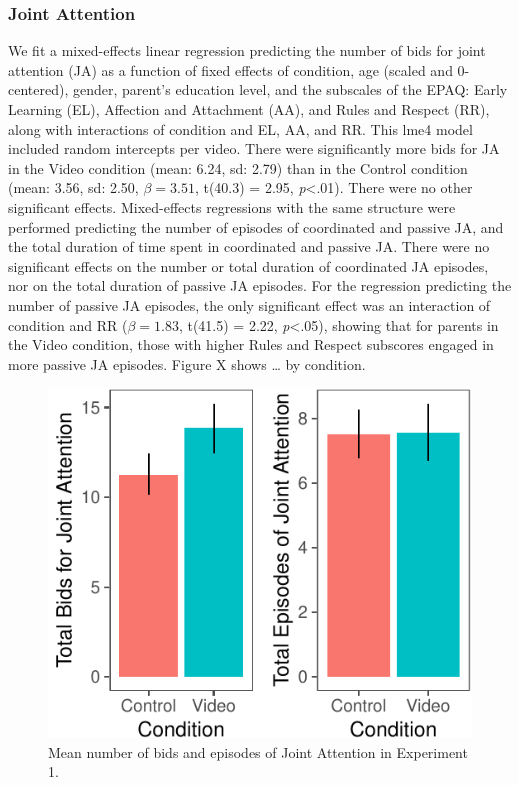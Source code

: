 \documentclass[]{article}
\begin{document}
\hypertarget{joint-attention}{%
\subsubsection{Joint Attention}\label{joint-attention}}

We fit a mixed-effects linear regression predicting the number of bids
for joint attention (JA) as a function of fixed effects of condition,
age (scaled and 0-centered), gender, parent's education level, and the
subscales of the EPAQ: Early Learning (EL), Affection and Attachment
(AA), and Rules and Respect (RR), along with interactions of condition
and EL, AA, and RR. This lme4 model included random intercepts per
video. There were significantly more bids for JA in the Video condition
(mean: 6.24, sd: 2.79) than in the Control condition (mean: 3.56, sd:
2.50, \(\beta=3.51\), t(40.3) = 2.95, \emph{p}\textless{}.01). There
were no other significant effects. Mixed-effects regressions with the
same structure were performed predicting the number of episodes of
coordinated and passive JA, and the total duration of time spent in
coordinated and passive JA. There were no significant effects on the
number or total duration of coordinated JA episodes, nor on the total
duration of passive JA episodes. For the regression predicting the
number of passive JA episodes, the only significant effect was an
interaction of condition and RR (\(\beta=1.83\), t(41.5) = 2.22,
\emph{p}\textless{}.05), showing that for parents in the Video
condition, those with higher Rules and Respect subscores engaged in more
passive JA episodes. Figure X shows \ldots{} by condition.

\begin{figure}[H]

{\centering \includegraphics{figs/e1ja-graphs-1} 

}

\caption{Mean number of bids and episodes of Joint Attention in Experiment 1.}\label{fig:e1ja-graphs}
\end{figure}
\end{document}
